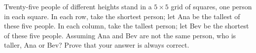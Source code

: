 Twenty-five people of different heights stand in a $5\times5$ grid of squares, one person in each square. In each row, take the shortest person; let Ana be the tallest of these five people. In each column, take the tallest person; let Bev be the shortest of these five people. Assuming Ana and Bev are not the same person, who is taller, Ana or Bev? Prove that your answer is always correct.
